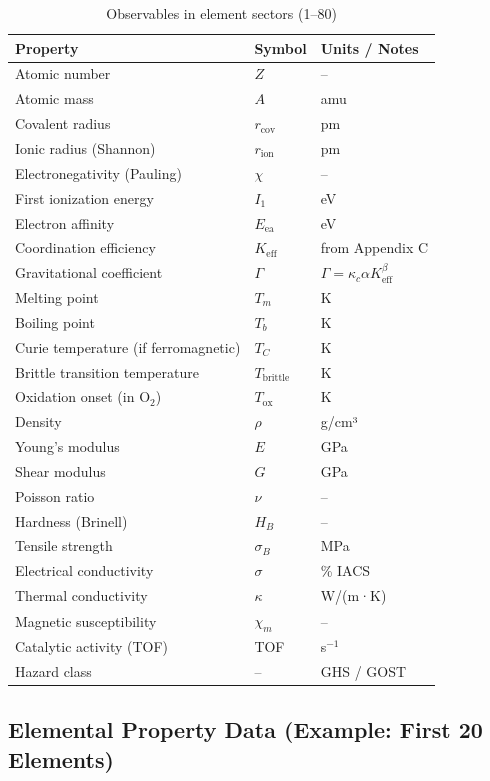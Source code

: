 \documentclass[12pt,a4paper]{article}
\newcommand{\Keff}{K_{\mathrm{eff}}}
\newcommand{\Gcoeff}{\Gamma}
\begin{document}
	\begin{longtable}{p{4cm} p{3cm} p{8cm}}
		\caption{Observables in element sectors (1–80)} \\
		\toprule
		\textbf{Property} & \textbf{Symbol} & \textbf{Units / Notes} \\
		\midrule
		Atomic number & \(Z\) & – \\
		Atomic mass & \(A\) & amu \\
		Covalent radius & \(r_{\text{cov}}\) & pm \\
		Ionic radius (Shannon) & \(r_{\text{ion}}\) & pm \\
		Electronegativity (Pauling) & \(\chi\) & – \\
		First ionization energy & \(I_1\) & eV \\
		Electron affinity & \(E_{\text{ea}}\) & eV \\
		Coordination efficiency & \(\Keff\) & from Appendix C \\
		Gravitational coefficient & \(\Gcoeff\) & \(\Gcoeff = \kappa_c \alpha \Keff^{\beta}\) \\
		Melting point & \(T_m\) & K \\
		Boiling point & \(T_b\) & K \\
		Curie temperature (if ferromagnetic) & \(T_C\) & K \\
		Brittle transition temperature & \(T_{\text{brittle}}\) & K \\
		Oxidation onset (in O$_{2}$) & \(T_{\text{ox}}\) & K \\
		Density & \(\rho\) & g/cm³ \\
		Young’s modulus & \(E\) & GPa \\
		Shear modulus & \(G\) & GPa \\
		Poisson ratio & \(\nu\) & – \\
		Hardness (Brinell) & \(H_B\) & – \\
		Tensile strength & \(\sigma_B\) & MPa \\
		Electrical conductivity & \(\sigma\) & \% IACS \\
		Thermal conductivity & \(\kappa\) & W/(m·K) \\
		Magnetic susceptibility & \(\chi_m\) & – \\
		Catalytic activity (TOF) & TOF & s$^{-1}$ \\
		Hazard class & – & GHS / GOST \\
		\bottomrule
	\end{longtable}
	
	\subsection{Elemental Property Data (Example: First 20 Elements)}
	
\end{document}
